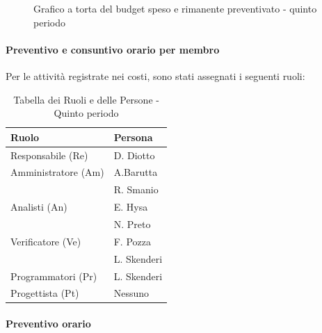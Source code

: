 \begin{figure}[H]
    \centering
    \begin{minipage}[b]{0.45\textwidth}
        \centering
        \caption{Grafico a torta del budget speso e rimanente preventivato - quinto periodo}
        \label{fig:Budget_speso_4}
    \end{minipage}
    \vspace{1cm}
\end{figure}

\paragraph{Preventivo e consuntivo orario per membro} \hspace{1pt}
Per le attività registrate nei costi, sono stati assegnati i seguenti ruoli:

\begin{table}[H]
    \centering
    \begin{tabular}{|l|l|}
    \hline
    \textbf{Ruolo} & \textbf{Persona} \\
    \hline
    \hline
    Responsabile (Re) & D. Diotto \\
    \hline
    Amministratore (Am) & A.Barutta  \\
    & R. Smanio \\
    \hline
    Analisti (An)   & E. Hysa \\
    & N. Preto \\
    \hline
    Verificatore (Ve)   & F. Pozza \\
    & L. Skenderi\\
     \hline
    Programmatori (Pr)  & L. Skenderi \\    
    \hline
    Progettista (Pt) & Nessuno \\
    \hline
    \end{tabular}
    \caption{Tabella dei Ruoli e delle Persone - Quinto periodo}
    \label{tab:Ruoli_persone_4}
    \end{table}
    

\paragraph*{Preventivo orario} \hspace{1pt}

